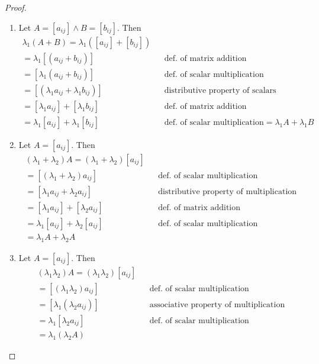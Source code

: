 \documentclass[11pt]{article}
\theoremstyle{definition}
\begin{document}
	\begin{shaded}
		\begin{proof}
			\begin{enumerate}[label=(\alph*)]
				\item Let $A = [a_{ij}] \land B = [b_{ij}]$. Then
				\begin{align*}
					\lambda_1(A+B) = \lambda_1([a_{ij}] + [b_{ij}]) \\
					= \lambda_1[(a_{ij} + b_{ij})] && \text{def. of matrix addition} \\
					= [\lambda_1(a_{ij} + b_{ij})] && \text{def. of scalar multiplication} \\
					= [(\lambda_1a_{ij} + \lambda_1b_{ij})] && \text{distributive property of scalars} \\
					= [\lambda_1a_{ij}] + [\lambda_1b_{ij}] && \text{def. of matrix addition} \\
					= \lambda_1[a_{ij}] + \lambda_1[b_{ij}] && \text{def. of scalar multiplication}
					= \lambda_1A + \lambda_1B
				\end{align*}
				
				\item Let $A = [a_{ij}]$. Then
				\begin{align*}
					(\lambda_1+\lambda_2)A = (\lambda_1+\lambda_2)[a_{ij}]\\
					= [(\lambda_1+\lambda_2)a_{ij}] && \text{def. of scalar multiplication} \\
					= [\lambda_1a_{ij} + \lambda_2a_{ij}] && \text{distributive property of multiplication} \\
					= [\lambda_1a_{ij}] + [\lambda_2a_{ij}] && \text{def. of matrix addition} \\
					= \lambda_1[a_{ij}] + \lambda_2[a_{ij}] && \text{def. of scalar multiplication} \\
					= \lambda_1A + \lambda_2A
				\end{align*} 
				
				\item Let $A = [a_{ij}]$. Then 
				\begin{align*}
					(\lambda_1\lambda_2)A = (\lambda_1\lambda_2)[a_{ij}] \\
					= [(\lambda_1\lambda_2)a_{ij}] && \text{def. of scalar multiplication} \\
					= [\lambda_1(\lambda_2a_{ij})] && \text{associative property of multiplication} \\
					= \lambda_1[\lambda_2a_{ij}] && \text{def. of scalar multiplication} \\
					= \lambda_1(\lambda_2A)
				\end{align*}
			\end{enumerate}
		\end{proof}
	\end{shaded}
\end{document}
